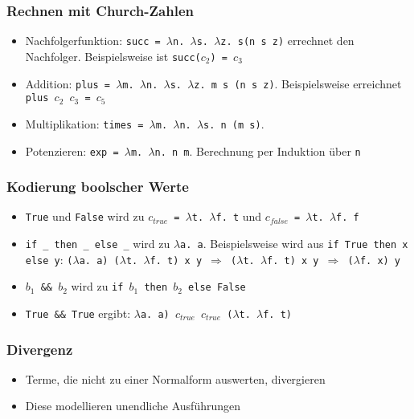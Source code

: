 \subsubsection{Rechnen mit Church-Zahlen}
\begin{itemize}
		\item Nachfolgerfunktion: \texttt{succ = \(\lambda\)n. \(\lambda\)s. \(\lambda\)z. s(n s z)} errechnet den Nachfolger. Beispielsweise ist \texttt{succ(\(c_2\)) = \(c_3\)}
		\item Addition: \texttt{plus = \(\lambda\)m. \(\lambda\)n. \(\lambda\)s. \(\lambda\)z. m s (n s z)}. Beispielsweise erreichnet \texttt{plus \(c_2\) \(c_3\) = \(c_5\)}
		\item Multiplikation: \texttt{times = \(\lambda\)m. \(\lambda\)n. \(\lambda\)s. n (m s)}.
		\item Potenzieren: \texttt{exp = \(\lambda\)m. \(\lambda\)n. n m}. Berechnung per Induktion über \texttt{n}
\end{itemize}

\subsubsection{Kodierung boolscher Werte}
\begin{itemize}
	\item \texttt{True} und \texttt{False} wird zu \texttt{\(c_{true}\) = \(\lambda\)t. \(\lambda\)f. t} und \texttt{\(c_{false}\) = \(\lambda\)t. \(\lambda\)f. f}
	\item \texttt{if \_ then \_ else \_} wird zu \texttt{\(\lambda\)a. a}. Beispielsweise wird aus \texttt{if True then x else y}: \texttt{(\(\lambda\)a. a) (\(\lambda\)t. \(\lambda\)f. t) x y \(\Rightarrow\) (\(\lambda\)t. \(\lambda\)f. t) x y \(\Rightarrow\) (\(\lambda\)f. x) y}
	\item \texttt{\(b_1\) \&\& \(b_2\)} wird zu \texttt{if \(b_1\) then \(b_2\) else False}
	\item \texttt{True \&\& True} ergibt: \texttt{\(\lambda\)a. a) \(c_{true}\) \(c_{true}\) (\(\lambda\)t. \(\lambda\)f. t)}
\end{itemize}

\subsubsection{Divergenz}
\begin{itemize}
	\item Terme, die nicht zu einer Normalform auswerten, divergieren
	\item Diese modellieren unendliche Ausführungen
\end{itemize}


